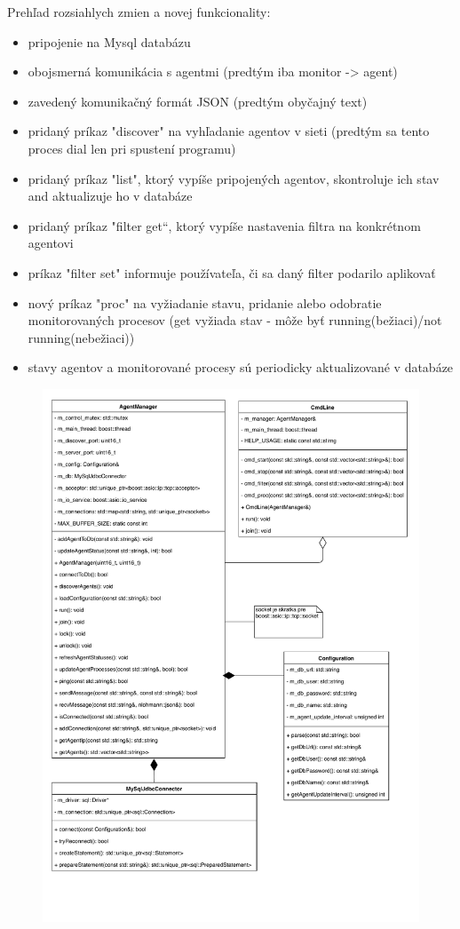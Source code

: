 \documentclass[a4paper,12pt]{article}
\begin{document}
\noindent Prehľad rozsiahlych zmien a novej funkcionality:
\begin{itemize} 
	\item pripojenie na Mysql databázu
	\item obojsmerná komunikácia s agentmi (predtým iba monitor -> agent)
	\item zavedený komunikačný formát JSON (predtým obyčajný text)
	\item pridaný príkaz "discover" na vyhľadanie agentov v sieti (predtým sa tento proces dial len pri spustení programu)
	\item pridaný príkaz "list", ktorý vypíše pripojených agentov, skontroluje ich stav and aktualizuje ho v databáze
	\item pridaný príkaz "filter get“, ktorý vypíše nastavenia filtra na konkrétnom agentovi
	\item príkaz "filter set" informuje používateľa, či sa daný filter podarilo aplikovať
	\item nový príkaz "proc" na vyžiadanie stavu, pridanie alebo odobratie monitorovaných procesov (get vyžiada stav - môže byť running(bežiaci)/not running(nebežiaci)) 
	\item stavy agentov a monitorované procesy sú periodicky aktualizované v databáze \\
\end{itemize}

\begin{figure}[h!]
	\centering
	\includegraphics[scale=0.75]{monitor.pdf}
\end{figure}
\end{document}
